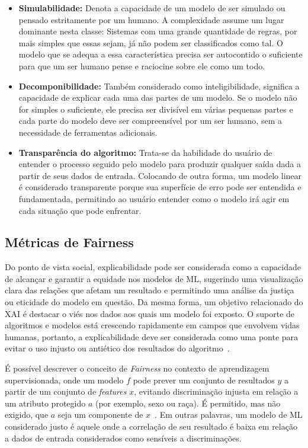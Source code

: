 \documentclass[portugues, 12pt, a4paper]{article}
\begin{document}
\begin{itemize}
\item \textbf{Simulabilidade:} Denota a capacidade de um modelo de ser simulado ou pensado estritamente por um humano. A complexidade assume um lugar dominante nesta classe: Sistemas com uma grande quantidade de regras, por mais simples que essas sejam, já não podem ser classificados como tal. O modelo que se adequa a essa característica precisa ser autocontido o suficiente para que um ser humano pense e raciocine sobre ele como um todo.
\item \textbf{Decomponibilidade:} Também considerado como inteligibilidade, significa a capacidade de explicar cada uma das partes de um modelo. Se o modelo não for simples o suficiente, ele precisa ser divisível em várias pequenas partes e cada parte do modelo deve ser compreensível por um ser humano, sem a necessidade de ferramentas adicionais.
\item \textbf{Transparência do algoritmo:} Trata-se da habilidade do usuário de entender o processo seguido pelo modelo para produzir qualquer saída dada a partir de seus dados de entrada. Colocando de outra forma, um modelo linear é considerado transparente porque sua superfície de erro pode ser entendida e fundamentada, permitindo ao usuário entender como o modelo irá agir em cada situação que pode enfrentar.
\end{itemize}

\subsection{Métricas de Fairness}

Do ponto de vista social, explicabilidade pode ser considerada como a capacidade de alcançar e garantir a equidade nos modelos de ML, sugerindo uma visualização clara das relações que afetam um resultado e permitindo uma análise da justiça ou eticidade do modelo em questão. Da mesma forma, um objetivo relacionado do XAI é destacar o viés nos dados aos quais um modelo foi exposto. O suporte de algoritmos e modelos está crescendo rapidamente em campos que envolvem vidas humanas, portanto, a explicabilidade deve ser considerada como uma ponte para evitar o uso injusto ou antiético dos resultados do algoritmo~\citep{Arrieta_2020}.

É possível descrever o conceito de \textit{Fairness} no contexto de aprendizagem supervisionada, onde um modelo $f$ pode prever um conjunto de resultados $y$ a partir de um conjunto de \textit{features} $x$, evitando discriminação injusta em relação a um atributo protegido $a$ (por exemplo, sexo ou raça). É permitido, mas não exigido, que $a$ seja um componente de $x$~\citep{Begley_2021}. Em outras palavras, um modelo de ML considerado justo é aquele onde a correlação de seu resultado é baixa em relação a dados de entrada considerados como sensíveis a discriminações.
\end{document}
